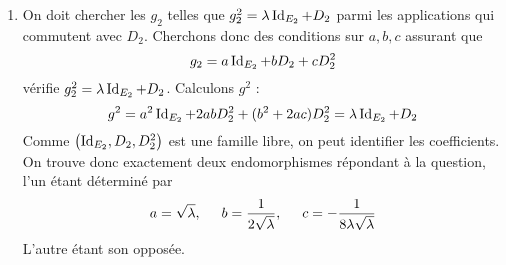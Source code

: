\begin{enumerate}
\begin{enumerate}
  \item On doit chercher les $g_2$ telles que $g_2^2=\lambda \operatorname{Id}_{E_2} +D_2$ parmi les applications qui commutent avec $D_2$. Cherchons donc des conditions sur $a,b,c$ assurant que
\begin{displaymath}
g_2 = a\operatorname{Id}_{E_2} + bD_2 + cD_2^2  
\end{displaymath}
v{\'e}rifie $g_2^2=\lambda \operatorname{Id}_{E_2} + D_2$. Calculons $g^2$ :
\begin{displaymath}
g^2 = a^2 \operatorname{Id}_{E_2} + 2abD_2^2 + (b^2+2ac)D_2^2 = \lambda \operatorname{Id}_{E_2} + D_2  
\end{displaymath}
Comme $\left( \operatorname{Id}_{E_2}, D_2, D_2^2\right)$ est une famille libre, on peut identifier les coefficients. On trouve donc exactement deux endomorphismes répondant à la question, l'un étant déterminé par
\begin{displaymath}
a = \sqrt{\lambda},\hspace{0.5cm} b=\frac{1}{2\sqrt{\lambda}},\hspace{0.5cm} c=-\frac{1}{8\lambda \sqrt{\lambda}} 
\end{displaymath}
L'autre {\'e}tant son oppos{\'e}e.
     \end{enumerate}
\end{enumerate}

